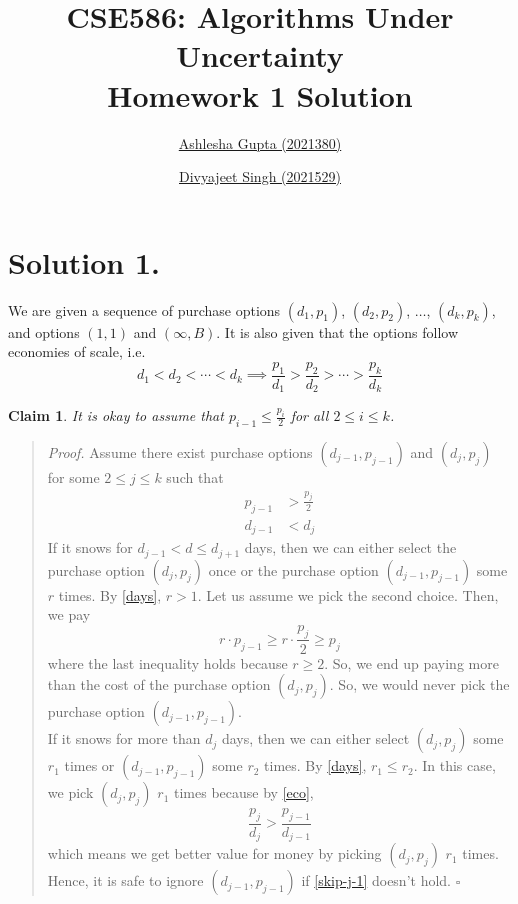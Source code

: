 \documentclass[11pt]{article}
\title{
    \textbf{CSE586: Algorithms Under Uncertainty} \\
    Homework 1 Solution %
}
\author{
    \href{mailto:ashlesha21380@iiitd.ac.in}{Ashlesha Gupta (2021380)} \and
    \href{mailto:divyajeet21529@iiitd.ac.in}{Divyajeet Singh (2021529)}
}
\date{}
\newtheorem{claim}{Claim}
\begin{document}
\maketitle

\section*{Solution 1.}
We are given a sequence of purchase options $(d_{1}, p_{1})$, $(d_{2}, p_{2})$, $\hdots$, $(d_{k}, p_{k})$, and options $(1, 1)$
and $(\infty, B)$. It is also given that the options follow economies of scale, i.e.
\begin{equation}
    \label{eco}
    d_{1} < d_{2} < \cdots < d_{k} \implies \frac{p_{1}}{d_{1}} > \frac{p_{2}}{d_{2}} > \cdots > \frac{p_{k}}{d_{k}}
\end{equation}

\begin{claim}
    \label{claim:assumption}
    It is okay to assume that $p_{i-1} \leq \frac{p_{i}}{2}$ for all $2 \leq i \leq k$.
\end{claim}
\begin{quote}
\textit{Proof.}
Assume there exist purchase options $(d_{j-1}, p_{j-1})$ and $(d_{j}, p_{j})$ for some $2 \leq j \leq k$ such that
\begin{align}
    \label{skip-j-1}
    p_{j-1} &> \frac{p_{j}}{2} \\
    \label{days}
    d_{j-1} &< d_{j}
\end{align}
If it snows for $d_{j-1} < d \leq d_{j+1}$ days, then we can either select the purchase option $(d_{j}, p_{j})$
once or the purchase option $(d_{j-1}, p_{j-1})$ some $r$ times. By \eqref{days}, $r > 1$.
Let us assume we pick the second choice. Then, we pay
\begin{equation}
    r \cdot p_{j-1} \geq r \cdot \frac{p_{j}}{2} \geq p_{j}
\end{equation}
where the last inequality holds because $r \geq 2$. So, we end up paying more than the cost
of the purchase option $(d_{j}, p_{j})$. So, we would never pick the purchase option $(d_{j-1}, p_{j-1})$. \\
If it snows for more than $d_{j}$ days, then we can either select $(d_{j}, p_{j})$ some $r_{1}$ times or
$(d_{j-1}, p_{j-1})$ some $r_{2}$ times. By \eqref{days}, $r_{1} \leq r_{2}$. In this case, we pick $(d_{j}, p_{j})$ $r_{1}$
times because by \eqref{eco},
\begin{equation}
    \frac{p_{j}}{d_{j}} > \frac{p_{j-1}}{d_{j-1}}
\end{equation}
which means we get better value for money by picking $(d_{j}, p_{j})$ $r_{1}$ times. \\
Hence, it is safe to ignore $(d_{j-1}, p_{j-1})$ if \eqref{skip-j-1} doesn't hold.
\hfill $\square$
\end{quote}
\end{document}
